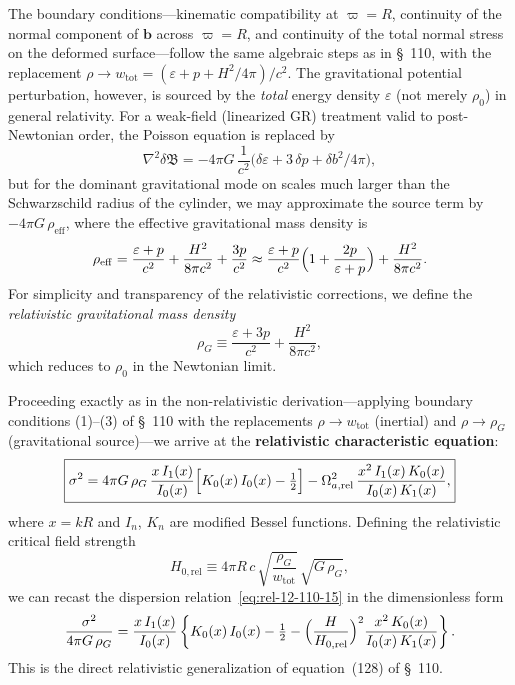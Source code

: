 The boundary conditions---kinematic compatibility at $\varpi = R$,
continuity of the normal component of $\mathbf{b}$ across $\varpi=R$,
and continuity of the total normal stress on the deformed
surface---follow the same algebraic steps as in \S~110, with the
replacement $\rho \to w_{\mathrm{tot}} = (\varepsilon + p + H^{2}/4\pi)/c^{2}$.
The gravitational potential perturbation, however, is sourced by the
\emph{total} energy density $\varepsilon$ (not merely $\rho_{0}$) in
general relativity.  For a weak-field (linearized GR) treatment valid
to post-Newtonian order, the Poisson equation is replaced by
\begin{equation}
\label{eq:rel-12-110-12}
\nabla^{2}\delta\mathfrak{B}
= -4\pi G\,\frac{1}{c^{2}}\bigl(\delta\varepsilon
+ 3\,\delta p + \delta b^{2}/4\pi\bigr),
\end{equation}
but for the dominant gravitational mode on scales much larger than the
Schwarzschild radius of the cylinder, we may approximate the source
term by $-4\pi G\,\rho_{\mathrm{eff}}$, where the effective
gravitational mass density is
\begin{equation}
\label{eq:rel-12-110-13}
\rho_{\mathrm{eff}} = \frac{\varepsilon + p}{c^{2}}
+ \frac{H^{2}}{8\pi c^{2}} + \frac{3p}{c^{2}}
\approx \frac{\varepsilon + p}{c^{2}}\Bigl(1 + \frac{2p}{\varepsilon+p}\Bigr)
+ \frac{H^{2}}{8\pi c^{2}}.
\end{equation}
For simplicity and transparency of the relativistic corrections, we
define the \emph{relativistic gravitational mass density}
\begin{equation}
\label{eq:rel-12-110-14}
\rho_{G} \equiv \frac{\varepsilon + 3p}{c^{2}}
+ \frac{H^{2}}{8\pi c^{2}},
\end{equation}
which reduces to $\rho_{0}$ in the Newtonian limit.

Proceeding exactly as in the non-relativistic derivation---applying
boundary conditions (1)--(3) of \S~110 with the replacements
$\rho \to w_{\mathrm{tot}}$ (inertial) and $\rho \to \rho_{G}$
(gravitational source)---we arrive at the \textbf{relativistic
characteristic equation}:
\begin{equation}
\label{eq:rel-12-110-15}
\boxed{\sigma^{2}
= 4\pi G\,\rho_{G}\,\frac{x\,I_{1}(x)}{I_{0}(x)}
\Bigl[K_{0}(x)\,I_{0}(x) - \tfrac{1}{2}\Bigr]
- \Omega_{a,\mathrm{rel}}^{2}\,
\frac{x^{2}\,I_{1}(x)\,K_{0}(x)}{I_{0}(x)\,K_{1}(x)},}
\end{equation}
where $x = kR$ and $I_{n}$, $K_{n}$ are modified Bessel functions.
Defining the relativistic critical field strength
\begin{equation}
\label{eq:rel-12-110-16}
H_{0,\mathrm{rel}} \equiv 4\pi R\,c\,
\sqrt{\frac{\rho_{G}}{w_{\mathrm{tot}}}}\,\sqrt{G\,\rho_{G}},
\end{equation}
we can recast the dispersion relation~\eqref{eq:rel-12-110-15} in the
dimensionless form
\begin{equation}
\label{eq:rel-12-110-17}
\frac{\sigma^{2}}{4\pi G\,\rho_{G}}
= \frac{x\,I_{1}(x)}{I_{0}(x)}
\left\{K_{0}(x)\,I_{0}(x) - \tfrac{1}{2}
- \Bigl(\frac{H}{H_{0,\mathrm{rel}}}\Bigr)^{2}
\frac{x^{2}\,K_{0}(x)}{I_{0}(x)\,K_{1}(x)}\right\}.
\end{equation}
This is the direct relativistic generalization of equation~(128) of
\S~110.

